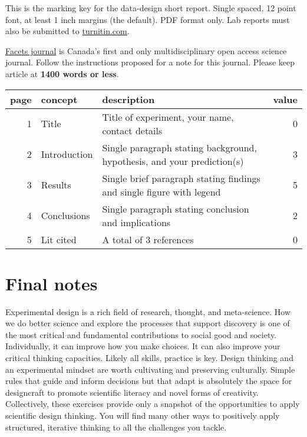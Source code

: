 \documentclass[
]{book}
\begin{document}
This is the marking key for the data-design short report. Single spaced, 12 point font, at least 1 inch margins (the default). PDF format only. Lab reports must also be submitted to \href{https://www.turnitin.com}{turnitin.com}.

\href{https://www.facetsjournal.com/for-authors/instructions-to-authors}{Facets journal} is Canada's first and only multidisciplinary open access science journal. Follow the instructions proposed for a note for this journal. Please keep article at \textbf{1400 words or less}.

\begin{tabular}{rllr}
\toprule
page & concept & description & value\\
\midrule
1 & Title & Title of experiment, your name, contact details & 0\\
2 & Introduction & Single paragraph stating background, hypothesis, and your prediction(s) & 3\\
3 & Results & Single brief paragraph stating findings and single figure with legend & 5\\
4 & Conclusions & Single paragraph stating conclusion and implications & 2\\
5 & Lit cited & A total of 3 references & 0\\
\bottomrule
\end{tabular}

\hypertarget{notes}{%
\chapter{Final notes}\label{notes}}

Experimental design is a rich field of research, thought, and meta-science. How we do better science and explore the processes that support discovery is one of the most critical and fundamental contributions to social good and society. Individually, it can improve how you make choices. It can also improve your critical thinking capacities. Likely all skills, practice is key. Design thinking and an experimental mindset are worth cultivating and preserving culturally. Simple rules that guide and inform decisions but that adapt is absolutely the space for designcraft to promote scientific literacy and novel forms of creativity. Collectively, these exercises provide only a snapshot of the opportunities to apply scientific design thinking. You will find many other ways to positively apply structured, iterative thinking to all the challenges you tackle.

  
\end{document}

